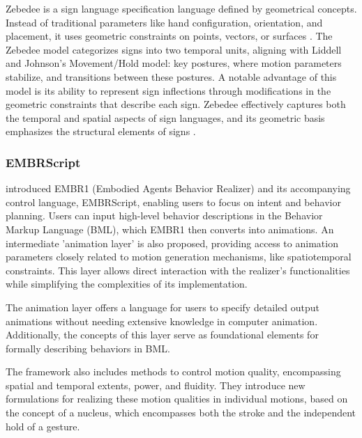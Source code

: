 Zebedee is a sign language specification language defined by geometrical concepts. Instead of traditional parameters like hand configuration, orientation, and placement, it uses geometric constraints on points, vectors, or surfaces \parencite{naert2020survey}. The Zebedee model categorizes signs into two temporal units, aligning with Liddell and Johnson's Movement/Hold model: key postures, where motion parameters stabilize, and transitions between these postures. A notable advantage of this model is its ability to represent sign inflections through modifications in the geometric constraints that describe each sign. Zebedee effectively captures both the temporal and spatial aspects of sign languages, and its geometric basis emphasizes the structural elements of signs \parencite{filhol2008modele}.

\subsubsection{EMBRScript}

\textcite{heloir2010real} introduced EMBR1 (Embodied Agents Behavior Realizer) and its accompanying control language, EMBRScript, enabling users to focus on intent and behavior planning. Users can input high-level behavior descriptions in the Behavior Markup Language (BML), which EMBR1 then converts into animations. An intermediate 'animation layer' is also proposed, providing access to animation parameters closely related to motion generation mechanisms, like spatiotemporal constraints. This layer allows direct interaction with the realizer's functionalities while simplifying the complexities of its implementation.

The animation layer offers a language for users to specify detailed output animations without needing extensive knowledge in computer animation. Additionally, the concepts of this layer serve as foundational elements for formally describing behaviors in BML.

The framework also includes methods to control motion quality, encompassing spatial and temporal extents, power, and fluidity. They introduce new formulations for realizing these motion qualities in individual motions, based on the concept of a nucleus, which encompasses both the stroke and the independent hold of a gesture.


